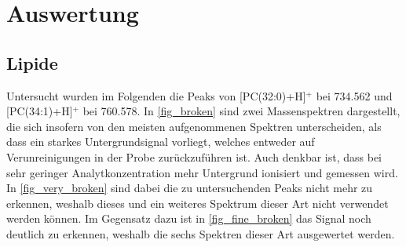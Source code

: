 \clearpage
\section{Auswertung}

\subsection{Lipide}

Untersucht wurden im Folgenden die Peaks von [PC(32:0)+H]$^+$ bei \SI{734.562}{} und [PC(34:1)+H]$^+$ bei \SI{760,578}{}.
In \cref{fig_broken} sind zwei Massenspektren dargestellt, die sich insofern von den meisten aufgenommenen Spektren unterscheiden, als dass ein starkes Untergrundsignal vorliegt, welches entweder auf Verunreinigungen in der Probe zurückzuführen ist.
Auch denkbar ist, dass bei sehr geringer Analytkonzentration mehr Untergrund ionisiert und gemessen wird.
In \cref{fig_very_broken} sind dabei die zu untersuchenden Peaks nicht mehr zu erkennen, weshalb dieses und ein weiteres Spektrum dieser Art nicht verwendet werden können.
Im Gegensatz dazu ist in \cref{fig_fine_broken} das Signal noch deutlich zu erkennen, weshalb die sechs Spektren dieser Art ausgewertet werden.


